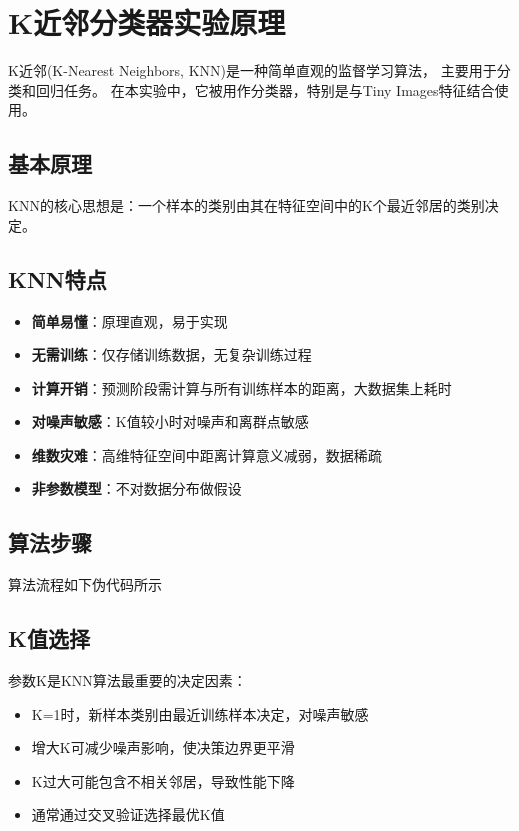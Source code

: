 \section{K近邻分类器实验原理}

K近邻(K-Nearest Neighbors, KNN)是一种简单直观的监督学习算法，
主要用于分类和回归任务。
在本实验中，它被用作分类器，特别是与Tiny Images特征结合使用。

\subsection{基本原理}
KNN的核心思想是：一个样本的类别由其在特征空间中的K个最近邻居的类别决定。

\subsection{KNN特点}
\begin{itemize}
    \item \textbf{简单易懂}：原理直观，易于实现
    \item \textbf{无需训练}：仅存储训练数据，无复杂训练过程
    \item \textbf{计算开销}：预测阶段需计算与所有训练样本的距离，大数据集上耗时
    \item \textbf{对噪声敏感}：K值较小时对噪声和离群点敏感
    \item \textbf{维数灾难}：高维特征空间中距离计算意义减弱，数据稀疏
    \item \textbf{非参数模型}：不对数据分布做假设
\end{itemize}

\subsection{算法步骤}
算法流程如下伪代码所示


\subsection{K值选择}
参数K是KNN算法最重要的决定因素：
\begin{itemize}
    \item K=1时，新样本类别由最近训练样本决定，对噪声敏感
    \item 增大K可减少噪声影响，使决策边界更平滑
    \item K过大可能包含不相关邻居，导致性能下降
    \item 通常通过交叉验证选择最优K值
\end{itemize}



